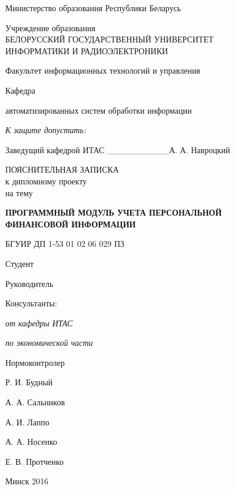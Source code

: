 \thispagestyle{empty}
\setlength{\parindent}{0ex} %

{\centering{}
  Министерство образования Республики Беларусь\par
}

\bigskip
{\centering{}
  Учреждение образования \\
  БЕЛОРУССКИЙ ГОСУДАРСТВЕННЫЙ УНИВЕРСИТЕТ \\
  ИНФОРМАТИКИ И РАДИОЭЛЕКТРОНИКИ\par
}

\bigskip
Факультет
информационных технологий и управления

\smallskip
\parbox{\widthof{Факультет}}{Кафедра}
автоматизированных систем обработки информации

\vspace{\baselineskip}
\hfill
\begin{minipage}{.4\textwidth}
  {\raggedright{}
    \textit{К защите допустить:}

    \smallskip
    Заведущий кафедрой ИТАС
    \_\_\_\_\_\_\_\_\_\_А. А. Навроцкий\par
  }
\end{minipage}

\vspace{2\baselineskip}

{\centering{}
  ПОЯСНИТЕЛЬНАЯ ЗАПИСКА \\
  к дипломному проекту \\
  на тему\par
}

\bigskip
{\centering{}
  \textbf{ПРОГРАММНЫЙ МОДУЛЬ УЧЕТА ПЕРСОНАЛЬНОЙ \\ ФИНАНСОВОЙ ИНФОРМАЦИИ}\par
}

\bigskip
{\centering{}
  БГУИР ДП 1-53 01 02 06 029 ПЗ\par
}

\vspace{\baselineskip}

\begin{minipage}{.6\textwidth}
Студент

Руководитель

Консультанты:

\hspace{0.3em} \textit{от кафедры ИТАС}

\hspace{0.3em} \textit{по экономической части}

Нормоконтролер
\end{minipage}
\hfill
\begin{minipage}{.3\textwidth}
  Р. И. Будный

  А. А. Сальников

  \vspace{\baselineskip}
  А. И. Лаппо

  А. А. Носенко

  Е. В. Протченко
\end{minipage}

\vfill

{\centering{}
  Минск 2016\par
}

\setlength{\parindent}{1.25cm} %
